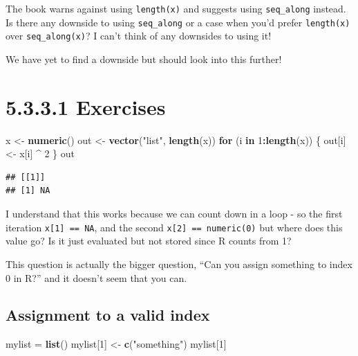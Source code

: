 \documentclass[]{book}
\newenvironment{Shaded}{\begin{snugshade}}{\end{snugshade}}
\newcommand{\ControlFlowTok}[1]{\textcolor[rgb]{0.13,0.29,0.53}{\textbf{#1}}}
\newcommand{\DecValTok}[1]{\textcolor[rgb]{0.00,0.00,0.81}{#1}}
\newcommand{\KeywordTok}[1]{\textcolor[rgb]{0.13,0.29,0.53}{\textbf{#1}}}
\newcommand{\NormalTok}[1]{#1}
\newcommand{\OperatorTok}[1]{\textcolor[rgb]{0.81,0.36,0.00}{\textbf{#1}}}
\newcommand{\StringTok}[1]{\textcolor[rgb]{0.31,0.60,0.02}{#1}}
\begin{document}
The book warns against using \texttt{length(x)} and suggests using \texttt{seq\_along} instead. Is there any downside to using \texttt{seq\_along} or a case when you'd prefer \texttt{length(x)} over \texttt{seq\_along(x)}? I can't think of any downsides to using it!

We have yet to find a downside but should look into this further!

\hypertarget{exercise5331}{%
\section*{5.3.3.1 Exercises}\label{exercise5331}}

\begin{Shaded}
\begin{Highlighting}[]
\NormalTok{x <-}\StringTok{ }\KeywordTok{numeric}\NormalTok{()}
\NormalTok{out <-}\StringTok{ }\KeywordTok{vector}\NormalTok{(}\StringTok{"list"}\NormalTok{, }\KeywordTok{length}\NormalTok{(x))}
\ControlFlowTok{for}\NormalTok{ (i }\ControlFlowTok{in} \DecValTok{1}\OperatorTok{:}\KeywordTok{length}\NormalTok{(x)) \{}
\NormalTok{  out[i] <-}\StringTok{ }\NormalTok{x[i] }\OperatorTok{^}\StringTok{ }\DecValTok{2}
\NormalTok{\}}
\NormalTok{out}
\end{Highlighting}
\end{Shaded}

\begin{verbatim}
## [[1]]
## [1] NA
\end{verbatim}

I understand that this works because we can count down in a loop - so the first iteration \texttt{x{[}1{]}\ ==\ NA}, and the second \texttt{x{[}2{]}\ ==\ numeric(0)} but where does this value go? Is it just evaluated but not stored since R counts from 1?

This question is actually the bigger question, ``Can you assign something to index 0 in R?'' and it doesn't seem that you can.

\hypertarget{assignment-valid}{%
\subsection*{Assignment to a valid index}\label{assignment-valid}}

\begin{Shaded}
\begin{Highlighting}[]
\NormalTok{mylist =}\StringTok{ }\KeywordTok{list}\NormalTok{()}
\NormalTok{mylist[}\DecValTok{1}\NormalTok{] <-}\StringTok{ }\KeywordTok{c}\NormalTok{(}\StringTok{"something"}\NormalTok{)}
\NormalTok{mylist[}\DecValTok{1}\NormalTok{]}
\end{Highlighting}
\end{Shaded}
\end{document}
